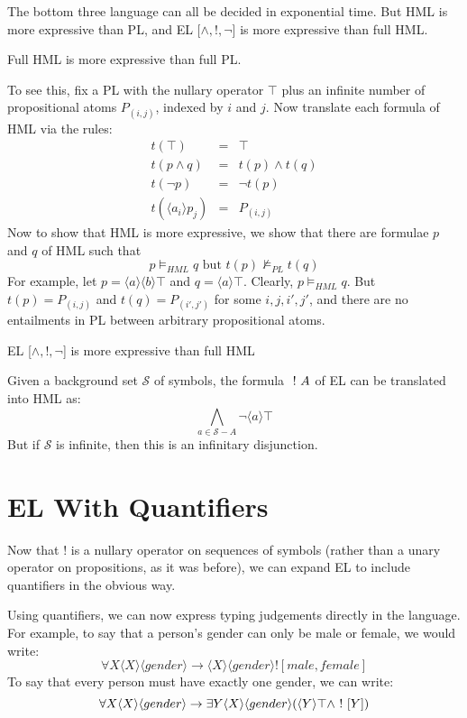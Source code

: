 The bottom three language can all be decided in exponential time.
But HML is more expressive than PL, and EL [$\land, !, \neg$]  is more expressive than full HML. 
\begin{proposition}
Full HML  is more expressive than full PL.
\end{proposition}
To see this, fix a PL with the nullary operator $\top$ plus an infinite number of propositional atoms $P_{(i,j)}$, indexed by $i$ and $j$.
Now translate each formula of HML via the rules:
\begin{eqnarray*}
t(\top)  & = & \top  \\
t(p \land q) & = & t(p) \land t(q)  \\
t(\neg p) & = & \neg t(p)   \\
t(\langle a_i \rangle p_j) & = & P_{(i,j)} 
\end{eqnarray*}
Now to show that HML is more expressive, we show that there are formulae $p$ and $q$ of HML such that
\[
p \models_{HML} q \mbox{ but } t(p) \nvDash_{PL} t(q)
\]
For example, let $p = \langle a \rangle \langle b \rangle \top$ and $q = \langle a \rangle \top$.
Clearly, $p \models_{HML} q$. But $t(p) = P_{(i,j)}$ and $t(q) = P_{(i',j')}$ for some $i,j,i',j'$, and there are no entailments in PL between arbitrary propositional atoms.

\begin{proposition}
EL [$\land, !, \neg$]  is more expressive than full HML
\end{proposition}
Given a background set $\mathcal{S}$ of symbols, the formula $\ ! \  A$ of EL can be translated into HML as:
\[
\bigwedge_{a \in \mathcal{S} - A} \neg \langle a \rangle \top
\]
But if $\mathcal{S}$ is infinite, then this is an infinitary disjunction.

\section{EL With Quantifiers}
Now that $!$ is a nullary operator on sequences of symbols (rather than a unary operator on propositions, as it was before), we can expand EL to include quantifiers in the obvious way.

Using quantifiers, we can now express typing judgements directly in the language. For example, to say that a person's gender can only be male or female, we would write:
\[
\forall X \langle X \rangle \langle gender \rangle \rightarrow \langle X \rangle \langle gender \rangle ![male, female]
\]
To say that every person must have exactly one gender, we can write:
\[
\forall X  \langle X \rangle \langle gender \rangle \rightarrow \exists Y \langle X \rangle \langle gender \rangle (\langle Y \rangle \top \land \ ! \  [Y])
\]


